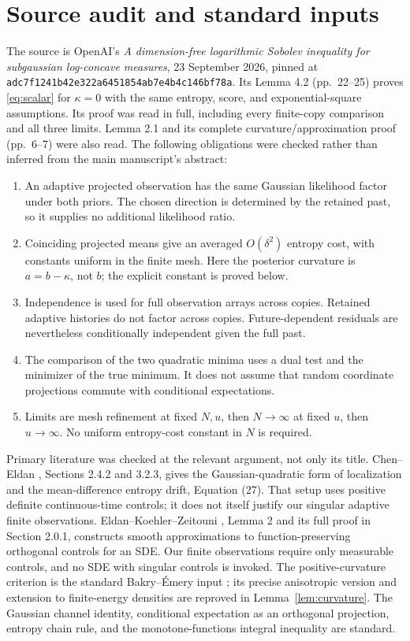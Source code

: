 \documentclass[11pt]{article}
\theoremstyle{remark}\newtheorem{remark}[theorem]{Remark}
\begin{document}
\section{Source audit and standard inputs}
The source is OpenAI's \emph{A dimension-free logarithmic Sobolev inequality
for subgaussian log-concave measures}, 23 September 2026, pinned at
\texttt{adc7f1241b42e322a6451854ab7e4b4c146bf78a}.
Its Lemma 4.2 (pp.\ 22--25) proves \eqref{eq:scalar} for $\kappa=0$ with the
same entropy, score, and exponential-square assumptions. Its proof was read
in full, including every finite-copy comparison and all three limits.
Lemma 2.1 and its complete curvature/approximation proof (pp.\ 6--7) were also
read. The following obligations were checked rather than inferred from the
main manuscript's abstract:
\begin{enumerate}
\item An adaptive projected observation has the same Gaussian likelihood
factor under both priors. The chosen direction is determined by the retained
past, so it supplies no additional likelihood ratio.
\item Coinciding projected means give an averaged $O(\delta^2)$ entropy cost,
with constants uniform in the finite mesh. Here the posterior curvature is
$a=b-\kappa$, not $b$; the explicit constant is proved below.
\item Independence is used for full observation arrays across copies.
Retained adaptive histories do not factor across copies. Future-dependent
residuals are nevertheless conditionally independent given the full past.
\item The comparison of the two quadratic minima uses a dual test and the
minimizer of the true minimum. It does not assume that random coordinate
projections commute with conditional expectations.
\item Limits are mesh refinement at fixed $N,u$, then $N\to\infty$ at fixed
$u$, then $u\to\infty$. No uniform entropy-cost constant in $N$ is required.
\end{enumerate}

Primary literature was checked at the relevant argument, not only its title.
Chen--Eldan \cite{CE}, Sections 2.4.2 and 3.2.3, gives the Gaussian-quadratic
form of localization and the mean-difference entropy drift, Equation (27).
That setup uses positive definite continuous-time controls; it does not
itself justify our singular adaptive finite observations.
Eldan--Koehler--Zeitouni \cite{EKZ}, Lemma 2 and its full proof in
Section 2.0.1, constructs smooth approximations to function-preserving
orthogonal controls for an SDE. Our finite observations require only
measurable controls, and no SDE with singular controls is invoked.
The positive-curvature criterion is the standard Bakry--\'Emery input
\cite{BE}; its precise anisotropic version and extension to finite-energy
densities are reproved in Lemma~\ref{lem:curvature}.
The Gaussian channel identity, conditional expectation as an orthogonal
projection, entropy chain rule, and the monotone-functions integral
inequality are standard.
\end{document}
